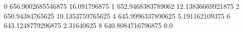 0 656.9002685546875 16.091796875
1 652.9468383789062 12.13836669921875
2 650.94384765625 10.1353759765625
4 645.9996337890625 5.191162109375
6 643.1248779296875 2.31640625
8 640.8084716796875 0.0
